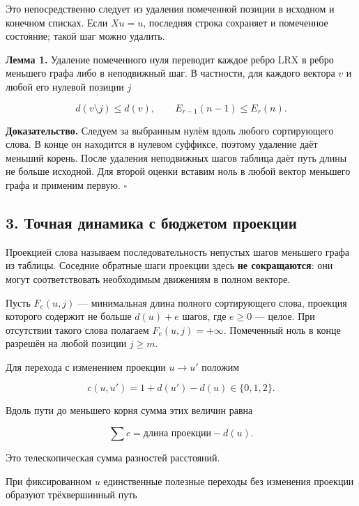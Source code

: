 \documentclass[
  11pt,
  a4paper,
]{article}
\begin{document}
Это непосредственно следует из удаления помеченной позиции в исходном и
конечном списках. Если \(Xu=u\), последняя строка сохраняет и помеченное
состояние; такой шаг можно удалить.

\textbf{Лемма 1.} Удаление помеченного нуля переводит каждое ребро LRX в
ребро меньшего графа либо в неподвижный шаг. В частности, для каждого
вектора \(v\) и любой его нулевой позиции \(j\)

\[d(v\setminus j)\le d(v),\qquad E_{r-1}(n-1)\le E_r(n). \tag{2}\]

\textbf{Доказательство.} Следуем за выбранным нулём вдоль любого
сортирующего слова. В конце он находится в нулевом суффиксе, поэтому
удаление даёт меньший корень. После удаления неподвижных шагов таблица
даёт путь длины не больше исходной. Для второй оценки вставим ноль в
любой вектор меньшего графа и применим первую. \(\square\)

\hypertarget{ux442ux43eux447ux43dux430ux44f-ux434ux438ux43dux430ux43cux438ux43aux430-ux441-ux431ux44eux434ux436ux435ux442ux43eux43c-ux43fux440ux43eux435ux43aux446ux438ux438}{%
\subsection{3. Точная динамика с бюджетом
проекции}\label{ux442ux43eux447ux43dux430ux44f-ux434ux438ux43dux430ux43cux438ux43aux430-ux441-ux431ux44eux434ux436ux435ux442ux43eux43c-ux43fux440ux43eux435ux43aux446ux438ux438}}

Проекцией слова называем последовательность непустых шагов меньшего
графа из таблицы. Соседние обратные шаги проекции здесь \textbf{не
сокращаются}: они могут соответствовать необходимым движениям в полном
векторе.

Пусть \(F_e(u,j)\) --- минимальная длина полного сортирующего слова,
проекция которого содержит не больше \(d(u)+e\) шагов, где \(e\ge0\) ---
целое. При отсутствии такого слова полагаем \(F_e(u,j)=+\infty\).
Помеченный ноль в конце разрешён на любой позиции \(j\ge m\).

Для перехода с изменением проекции \(u\to u'\) положим

\[c(u,u')=1+d(u')-d(u)\in\{0,1,2\}. \tag{3}\]

Вдоль пути до меньшего корня сумма этих величин равна

\[\sum c=\text{длина проекции}-d(u). \tag{4}\]

Это телескопическая сумма разностей расстояний.

При фиксированном \(u\) единственные полезные переходы без изменения
проекции образуют трёхвершинный путь
\end{document}
